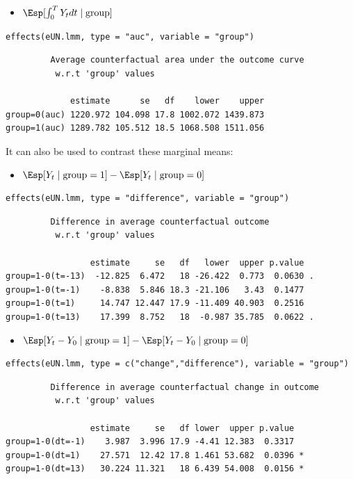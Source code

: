 \documentclass[12pt]{article}
\begin{document}
\begin{itemize}
\item \(\Esp[\int_0^T Y_t dt \mid \text{group}]\)
\end{itemize}
\lstset{language=r,label= ,caption= ,captionpos=b,numbers=none}
\begin{lstlisting}
effects(eUN.lmm, type = "auc", variable = "group")
\end{lstlisting}

\begin{verbatim}
	     Average counterfactual area under the outcome curve
	      w.r.t 'group' values 

             estimate      se   df    lower    upper
group=0(auc) 1220.972 104.098 17.8 1002.072 1439.873
group=1(auc) 1289.782 105.512 18.5 1068.508 1511.056
\end{verbatim}


It can also be used to contrast these marginal means:
\begin{itemize}
\item \(\Esp[Y_t \mid \text{group}=1]-\Esp[Y_t \mid \text{group}=0]\)
\end{itemize}
\lstset{language=r,label= ,caption= ,captionpos=b,numbers=none}
\begin{lstlisting}
effects(eUN.lmm, type = "difference", variable = "group")
\end{lstlisting}

\begin{verbatim}
	     Difference in average counterfactual outcome
	      w.r.t 'group' values 

                 estimate     se   df   lower  upper p.value  
group=1-0(t=-13)  -12.825  6.472   18 -26.422  0.773  0.0630 .
group=1-0(t=-1)    -8.838  5.846 18.3 -21.106   3.43  0.1477  
group=1-0(t=1)     14.747 12.447 17.9 -11.409 40.903  0.2516  
group=1-0(t=13)    17.399  8.752   18  -0.987 35.785  0.0622 .
\end{verbatim}


\begin{itemize}
\item \(\Esp[Y_t-Y_0 \mid \text{group}=1]-\Esp[Y_t-Y_0 \mid \text{group}=0]\)
\end{itemize}
\lstset{language=r,label= ,caption= ,captionpos=b,numbers=none}
\begin{lstlisting}
effects(eUN.lmm, type = c("change","difference"), variable = "group")
\end{lstlisting}

\begin{verbatim}
	     Difference in average counterfactual change in outcome
	      w.r.t 'group' values 

                 estimate     se   df lower  upper p.value  
group=1-0(dt=-1)    3.987  3.996 17.9 -4.41 12.383  0.3317  
group=1-0(dt=1)    27.571  12.42 17.8 1.461 53.682  0.0396 *
group=1-0(dt=13)   30.224 11.321   18 6.439 54.008  0.0156 *
\end{verbatim}
\end{document}
